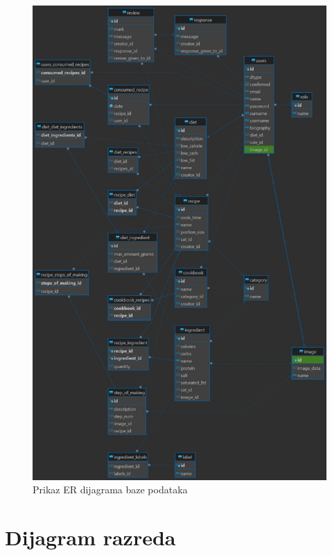 				
				
				
				
				
				
				
				
				
			\begin{figure}[H]
			\includegraphics[scale=0.3]{slike/er.PNG} %
			\centering
			\caption{Prikaz ER dijagrama baze podataka}
			\label{er}
		\end{figure}
				
				\eject	
	
	  \section{Dijagram razreda}
	  
